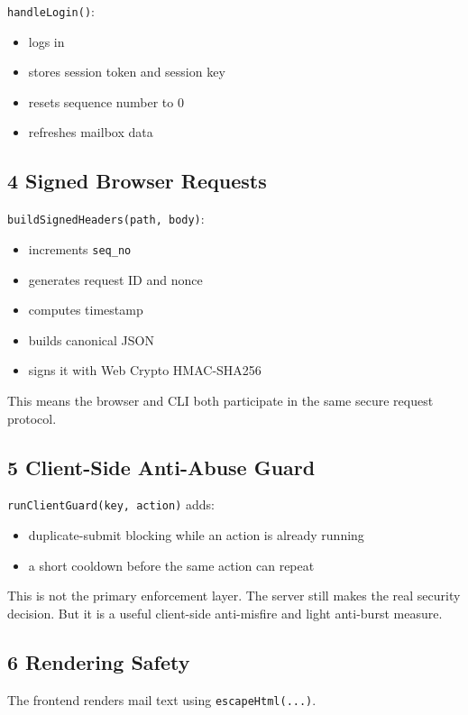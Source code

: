 \documentclass[11pt,a4paper]{article}
\begin{document}
\nolinkurl{handleLogin()}:

\begin{itemize}
\item logs in
\item stores session token and session key
\item resets sequence number to 0
\item refreshes mailbox data
\end{itemize}

\subsection{4 Signed Browser Requests}

\nolinkurl{buildSignedHeaders(path, body)}:

\begin{itemize}
\item increments \nolinkurl{seq_no}
\item generates request ID and nonce
\item computes timestamp
\item builds canonical JSON
\item signs it with Web Crypto HMAC-SHA256
\end{itemize}

This means the browser and CLI both participate in the same secure request protocol.

\subsection{5 Client-Side Anti-Abuse Guard}

\nolinkurl{runClientGuard(key, action)} adds:

\begin{itemize}
\item duplicate-submit blocking while an action is already running
\item a short cooldown before the same action can repeat
\end{itemize}

This is not the primary enforcement layer. The server still makes the real security decision. But it is a useful client-side anti-misfire and light anti-burst measure.

\subsection{6 Rendering Safety}

The frontend renders mail text using \nolinkurl{escapeHtml(...)}.
\end{document}
